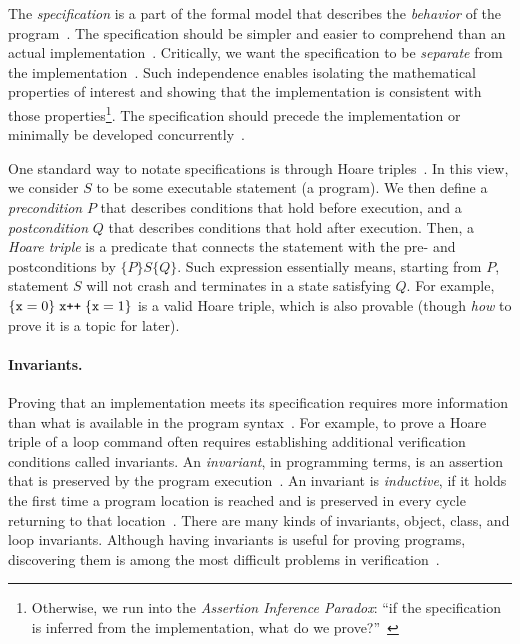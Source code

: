 The \emph{specification} is a part of the formal model that describes the \emph{behavior} of the program~\cite{zave2023b}.
The specification should be simpler and easier to comprehend than an actual implementation~\cite{zave2023b}.
Critically, we want the specification to be \emph{separate} from the implementation~\cite{furia2014b}.
Such independence enables isolating the mathematical properties of interest and showing that the implementation is consistent with those properties\footnote{
Otherwise, we run into the \emph{Assertion Inference Paradox}:
\enquote{if the specification is inferred from the implementation, what do we prove?}~\cite{furia2014b}}.
The specification should precede the implementation or minimally be developed concurrently~\cite{dijkstra1972}.

One standard way to notate specifications is through Hoare triples~\cite{hoare1969}.
In this view, we consider \(S\) to be some executable statement (a program).
We then define a \emph{precondition} \(P\) that describes conditions that hold before execution,
and a \emph{postcondition} \(Q\) that describes conditions that hold after execution.
Then, a \emph{Hoare triple} is a predicate that connects the statement with the pre- and postconditions by \(\{P\} S \{Q\}\).
Such expression essentially means, starting from \(P\), statement \(S\) will not crash and terminates in a state satisfying \(Q\).
For example, \(\{ \prm{x}=0 \}\;\prm{x++}\;\{ \prm{x}=1\}\) is a valid Hoare triple, which is also provable (though \emph{how} to prove it is a topic for later).

\paragraph*{Invariants.}
Proving that an implementation meets its specification requires more information than what is available in the program syntax~\cite{chang2005}.
For example, to prove a Hoare triple of a loop command often requires establishing additional verification conditions called invariants.
An \emph{invariant}, in programming terms, is an assertion that is preserved by the program execution~\cite{furia2014}.
An invariant is \emph{inductive},
if it holds the first time a program location is reached and is preserved in every cycle returning to that location~\cite{sankaranarayanan2004}.
There are many kinds of invariants, \eg object, class, and loop invariants.
Although having invariants is useful for proving programs, discovering them is among the most difficult problems in verification~\cite{dillig2013,yu2023}.

